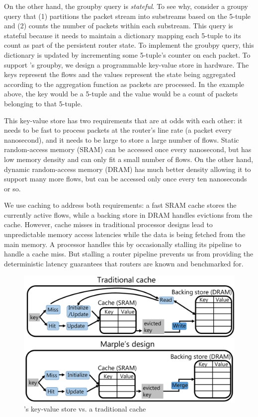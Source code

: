 On the other hand, the {\ct groupby} query is {\em stateful}. To see why,
consider a {\ct groupy} query that (1) partitions the packet stream into
substreams based on the 5-tuple and (2) counts the number of packets within
each substream. This query is stateful because it needs to maintain a
dictionary mapping each 5-tuple to its count as part of the persistent router
state. To implement the {\ct groubpy} query, this dictionary is updated by
incrementing some 5-tuple's counter on each packet. To support \TheSystem's
 {\ct groupby}, we design a programmable key-value store
in hardware. The keys represent the flows and the values represent the state
being aggregated according to the aggregation function as packets are
processed. In the example above, the key would be a 5-tuple and the value would
be a count of packets belonging to that 5-tuple.

This key-value store has two requirements that are at odds with each other: it
needs to be fast to process packets at the router's line rate (a packet every
nanosecond), and it needs to be large to store a large number of flows. Static
random-access memory (SRAM) can be accessed once every nanosecond, but has low
memory density and can only fit a small number of flows. On the other hand,
dynamic random-access memory (DRAM) has much better density allowing it to
support many more flows, but can be accessed only once every ten nanoseconds or
so.

We use caching to address both requirements: a fast SRAM cache stores the
currently active flows, while a backing store in DRAM handles evictions from
the cache. However, cache misses in traditional processor designs lead to
unpredictable memory access latencies while the data is being fetched from the
main memory. A processor handles this by occasionally stalling its pipeline to
handle a cache miss. But stalling a router pipeline prevents us from providing
the deterministic latency guarantees that routers are known and benchmarked
for.

\begin{figure}
\centering
\includegraphics[width=0.6\columnwidth]{pq_kv_store.pdf}
\caption{\TheSystem's key-value store vs. a traditional cache}
\label{fig:hw_diff}
\end{figure}

